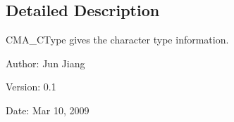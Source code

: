 \subsection{Detailed Description}
CMA\_\-CType gives the character type information. 

\begin{Desc}
\item[Author:]Jun Jiang \end{Desc}
\begin{Desc}
\item[Version:]0.1 \end{Desc}
\begin{Desc}
\item[Date:]Mar 10, 2009 \end{Desc}
